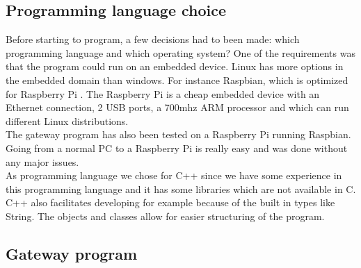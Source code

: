 \subsection{Programming language choice}
Before starting to program, a few decisions had to been made: which programming language and which operating system? One of the requirements was that the program could run on an embedded device. Linux has more options in the embedded domain than windows. For instance Raspbian, which is optimized for Raspberry Pi . The Raspberry Pi is a cheap embedded device with an Ethernet connection, 2 USB ports, a 700mhz ARM processor and which can run different Linux distributions.\\
The gateway program has also been tested on a Raspberry Pi running Raspbian. Going from a normal PC to a Raspberry Pi is really easy and was done without any major issues.\\
As programming language we chose for C++ since we have some experience in this programming language and it has some libraries which are not available in C. C++ also facilitates developing for example because of the built in types like String. The objects and classes allow for easier structuring of the program.

\subsection{Gateway program}%
